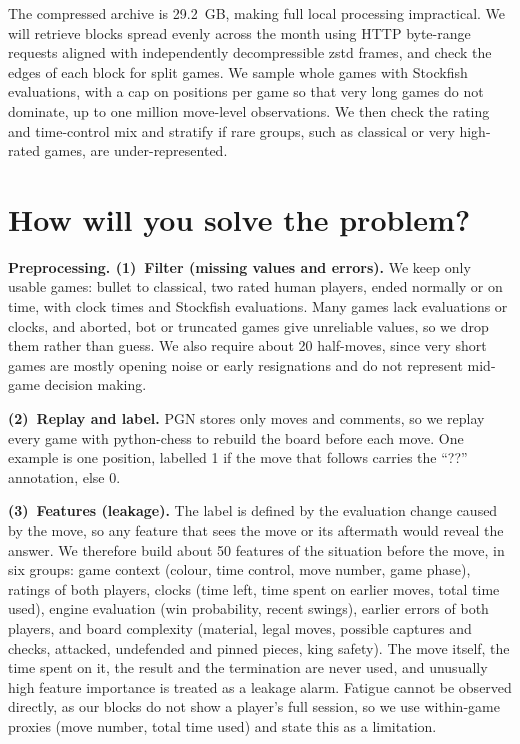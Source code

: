 \documentclass[a4paper,oneside,bibliography=totoc]{scrbook}
\begin{document}
The compressed archive is 29.2~GB, making full local processing
impractical. We will retrieve blocks spread evenly across the month using
HTTP byte-range requests aligned with independently decompressible zstd
frames, and check the edges of each block for split games. We sample whole
games with Stockfish evaluations, with a cap on positions per game so that
very long games do not dominate, up to one million move-level observations.
We then check the rating and time-control mix and stratify if rare groups,
such as classical or very high-rated games, are under-represented.

\section{How will you solve the problem?}
\label{sec:solve}

\textbf{Preprocessing. (1)~Filter (missing values and errors).} We keep only
usable games: bullet to classical, two rated human players, ended normally or
on time, with clock times and Stockfish evaluations. Many games lack
evaluations or clocks, and aborted, bot or truncated games give unreliable
values, so we drop them rather than guess. We also require about 20
half-moves, since very short games are mostly opening noise or early
resignations and do not represent mid-game decision making.

\textbf{(2)~Replay and label.} PGN stores only moves and comments, so we
replay every game with python-chess to rebuild the board before each move.
One example is one position, labelled 1 if the move that follows carries the
``??'' annotation, else 0.

\textbf{(3)~Features (leakage).} The label is defined by the evaluation
change caused by the move, so any feature that sees the move or its aftermath
would reveal the answer. We therefore build about 50 features of the
situation before the move, in six groups: game context (colour, time control,
move number, game phase), ratings of both players, clocks (time left, time
spent on earlier moves, total time used), engine evaluation (win probability,
recent swings), earlier errors of both players, and board complexity
(material, legal moves, possible captures and checks, attacked, undefended
and pinned pieces, king safety). The move itself, the time spent on it, the
result and the termination are never used, and unusually high feature
importance is treated as a leakage alarm. Fatigue cannot be observed
directly, as our blocks do not show a player's full session, so we use
within-game proxies (move number, total time used) and state this as a
limitation.
\end{document}
